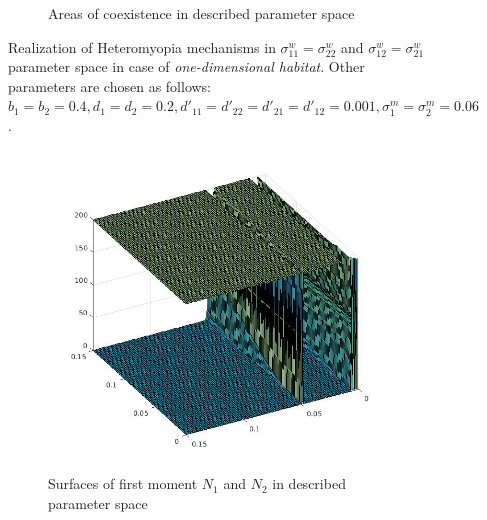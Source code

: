 \begin{figure}[ht]
\begin{subfigure}{.5\textwidth}
	\caption{Areas of coexistence in described parameter space} 
	\label{fig:hmd1:sub4}
\end{subfigure}
	\caption{Realization of Heteromyopia mechanisms in  $\sigma_{11}^{w}=\sigma_{22}^{w}$ and $\sigma_{12}^{w}=\sigma_{21}^{w}$ parameter space in case of \emph{one-dimensional habitat}. Other parameters are chosen as follows: $b_{1}=b_{2}=0.4
		, d_{1}=d_{2}=0.2
		, d'_{11}=d'_{22}=d'_{21}=d'_{12}=0.001,
		\sigma_{1}^{m}=\sigma_{2}^{m}=0.06$. }
	\label{fig:hmd1}
\end{figure}

\begin{figure}[ht]
	\centering
	\begin{subfigure}{.5\textwidth}
		\centering
		\includegraphics[width=.93\linewidth]{N1N2hm04D2.jpg}
		\caption{Surfaces of first moment \(N_1\) and \(N_2\) in described parameter space}
		\label{fig:hmd2:sub1}
	\end{subfigure}%
	\begin{subfigure}{.5\textwidth}
		\centering

\end{subfigure}
\end{figure}
